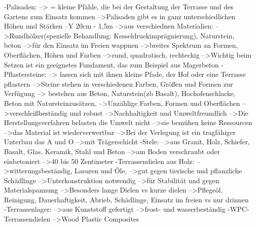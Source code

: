                     -Palisaden:
                        --> = kleine Pfähle, die bei der Gestaltung der Terrasse und des Gartens zum Einsatz kommen
                        -->Palisaden gibt es in ganz unterschiedlichen Höhen und Stärken
                            --Y 20cm - 1,5m
                        -->aus verschiednen Materialien:
                            -->Rundhölzer(spezielle Behandlung: Kesseldruckimprägnierung), Naturstein, beton -->für den Einsatz im Freien wappnen
                        -->breites Spektrum an Formen, Oberflächen, Höhen und Farben
                            -->rund, quadratisch, rechteckig
                        -->Wichtig beim Setzen ist ein geeignetes Fundament, das zum         Beispiel aus Magerbeton
                    -Pflastersteine:
                        --> lassen sich mit ihnen kleine Pfade, der Hof oder eine Terrasse pflastern
                        -->Steine stehen in verschiedenen Farben, Größen und Formen zur Verfügung
                        --> bestehen aus Beton, Naturstein(zb Basalt), Hochofenschlacke, Beton mit Natursteinzusätzen, 
                        -->Unzählige Farben, Formen und Oberflächen
                        -->verschleißbeständig und robust
                        -->Nachhaltigkeit und Umweltfreundlich
                            -->Die Herstellungsverfahren belasten die Umwelt nicht
                            -->sie bemühen keine Ressourcen
                            -->das Material ist wiederverwertbar
                        -->Bei der Verlegung ist ein tragfähiger Unterbau das A und O
                            -->mit Trägerschicht
                    -Stele:
                        -->aus Granit, Holz, Schiefer, Basalt, Glas, Keramik, Stahl und Beton
                        -->am Boden verschraubt oder einbetoniert 
                            -->40 bis 50 Zentimeter
                    -Terrassendielen aus Holz:
                        -->witterungsbeständig, Lasuren und Öle, 
                            -->gut gegen tierische und pflanzliche Schädlinge 
                        -->Unterkonstruktion notwendig
                            -->für Stabilität und gegen Materialspannung
                        -->Besonders lange Dielen vs kurze dielen
                        -->Pflegeöl, Reinigung, Dauerhaftigkeit, Abrieb, Schädlinge, Einsatz im freien vs nur drinnen
                    -Terrassenlager:
                        -->aus Kunststoff gefertigt
                        -->frost- und wasserbeständig
                    -WPC-Terrassendielen
                        -->Wood Plastic Composites
